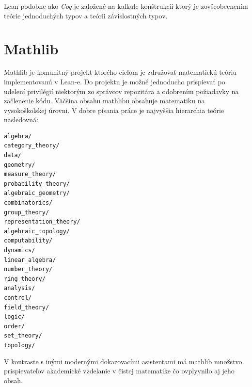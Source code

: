 \documentclass[a4paper,10pt,oneside]{report}%
\begin{document}
    Lean podobne ako \emph{Coq} je založené na kalkule konštrukcií ktorý je zovšeobecnením teórie jednoduchých typov
    a teórii závislostných typov.
\section{Mathlib}
    Mathlib je komunitný projekt\cite{mathlib} ktorého cieľom je združovať matematickú
teóriu implementovanú v Lean-e.
    Do projektu je možné jednoducho prispievať po udelení privilégií niektorým zo
správcov repozitára a odobrením požiadavky na začlenenie kódu.
    Väčšina obsahu mathlibu obsahuje matematiku na vysokoškolskej úrovni.
    V dobre písania práce je najvyššia hierarchia teórie nasledovná:
\begin{lstlisting}
algebra/
category_theory/
data/
geometry/
measure_theory/
probability_theory/
algebraic_geometry/
combinatorics/
group_theory/
representation_theory/
algebraic_topology/
computability/
dynamics/
linear_algebra/
number_theory/
ring_theory/
analysis/
control/
field_theory/
logic/
order/
set_theory/
topology/
\end{lstlisting}
    V kontraste s inými modernými dokazovacími asistentami má mathlib množstvo
prispievateľov akademické vzdelanie v čistej matematike\cite{mathlib_paper} čo
ovplyvnilo aj jeho obsah.
\end{document}
